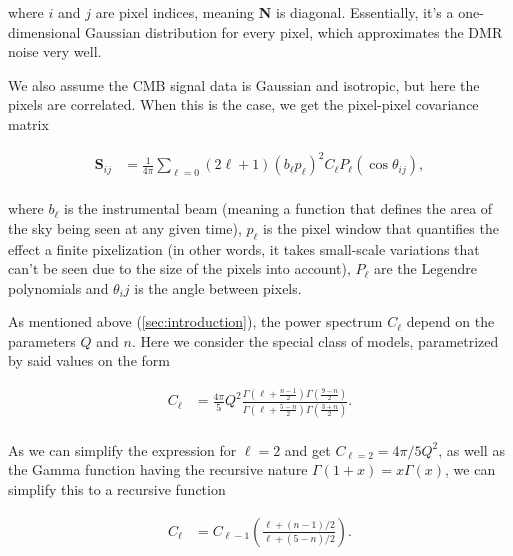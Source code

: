\documentclass{emulateapj}
\begin{document}
\noindent 
where $i$ and $j$ are pixel indices, meaning \textbf{N} is diagonal. Essentially, it's a one-dimensional Gaussian distribution for every pixel, which approximates the DMR noise very well.

We also assume the CMB signal data is Gaussian and isotropic, but here the pixels are correlated. When this is the case, we get the pixel-pixel covariance matrix 


  \begin{equation}
  \label{s_cov}
  \begin{array}{rl}
  \textbf{S}_{ij}  &= \frac{1}{4\pi} \sum_{\ell = 0}^{}(2\ell + 1)(b_{\ell}p_{\ell})^2C_{\ell}P_{\ell}(\cos \theta_{ij}), \\
  \end{array}
  \end{equation}
  
 \noindent
 where $b_{\ell}$ is the instrumental beam (meaning a function that defines the area of the sky being seen at any given time), $p_{\ell}$ is the pixel window that quantifies the effect a finite pixelization (in other words, it takes small-scale variations that can't be seen due to the size of the pixels into account), $P_{\ell}$ are the Legendre polynomials and $\theta_ij$ is the angle between pixels.
 
 As mentioned above (\ref{sec:introduction}), the power spectrum $C_\ell$ depend on the parameters $Q$ and $n$. Here we consider the special class of models, parametrized by said values on the form
 
  \begin{equation}
  \label{c_ell}
  \begin{array}{rl}
  C_{\ell} &= \frac{4\pi}{5}Q^2 \frac{\Gamma(\ell + \frac{n-1}{2})\Gamma(\frac{9-n}{2})}{\Gamma(\ell + \frac{5-n}{2})\Gamma(\frac{3+n}{2})}.  \\ 
  \end{array}
  \end{equation}
 
As we can simplify the expression for $\ell = 2$ and get $C_{\ell=2} = 4\pi/5 Q^2$, as well as the Gamma function having the recursive nature $\Gamma(1+x) = x\Gamma(x)$, we can simplify this to a recursive function  
 
 
\begin{equation}
  \label{c_ell_num}
  \begin{array}{rl}
  C_{\ell} &= C_{\ell - 1} (\frac{\ell+(n-1)/2}{\ell+(5-n)/2}).   \\ 
  \end{array}
\end{equation}
\end{document}
